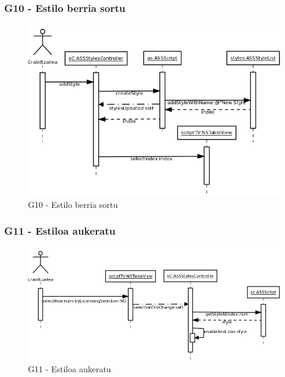 \subsubsection{G10 - Estilo berria sortu}
\begin{figure}[htp]
\begin{center}
\includegraphics[scale=0.35]{Pictures/Chapter4/Diseinua/G10.png}
\caption{G10 - Estilo berria sortu}
\label{g10d}
\end{center}
\end{figure}


\subsubsection{G11 - Estiloa aukeratu}
\begin{figure}[htp]
\begin{center}
\includegraphics[scale=0.35]{Pictures/Chapter4/Diseinua/G11.png}
\caption{G11 - Estiloa aukeratu}
\label{g11d}
\end{center}
\end{figure}

\newpage
